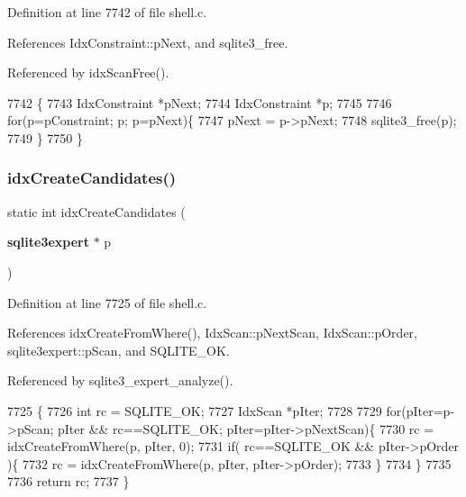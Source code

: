 Definition at line 7742 of file shell.\+c.



References Idx\+Constraint\+::p\+Next, and sqlite3\+\_\+free.



Referenced by idx\+Scan\+Free().


\begin{DoxyCode}
7742                                                          \{
7743   IdxConstraint *pNext;
7744   IdxConstraint *p;
7745 
7746   \textcolor{keywordflow}{for}(p=pConstraint; p; p=pNext)\{
7747     pNext = p->pNext;
7748     sqlite3_free(p);
7749   \}
7750 \}
\end{DoxyCode}
\mbox{\label{shell_8c_ac82108f8d07c996dbc47111007416f18}} 
\subsubsection{idx\+Create\+Candidates()}
{\footnotesize\ttfamily static int idx\+Create\+Candidates (\begin{DoxyParamCaption}\item[{\textbf{ sqlite3expert} $\ast$}]{p }\end{DoxyParamCaption})\hspace{0.3cm}{\ttfamily [static]}}



Definition at line 7725 of file shell.\+c.



References idx\+Create\+From\+Where(), Idx\+Scan\+::p\+Next\+Scan, Idx\+Scan\+::p\+Order, sqlite3expert\+::p\+Scan, and S\+Q\+L\+I\+T\+E\+\_\+\+OK.



Referenced by sqlite3\+\_\+expert\+\_\+analyze().


\begin{DoxyCode}
7725                                                 \{
7726   \textcolor{keywordtype}{int} rc = SQLITE_OK;
7727   IdxScan *pIter;
7728 
7729   \textcolor{keywordflow}{for}(pIter=p->pScan; pIter && rc==SQLITE_OK; pIter=pIter->pNextScan)\{
7730     rc = idxCreateFromWhere(p, pIter, 0);
7731     \textcolor{keywordflow}{if}( rc==SQLITE_OK && pIter->pOrder )\{
7732       rc = idxCreateFromWhere(p, pIter, pIter->pOrder);
7733     \}
7734   \}
7735 
7736   \textcolor{keywordflow}{return} rc;
7737 \}
\end{DoxyCode}
\mbox{\label{shell_8c_ad742e832559b2b85c54b940adff815ba}} 

